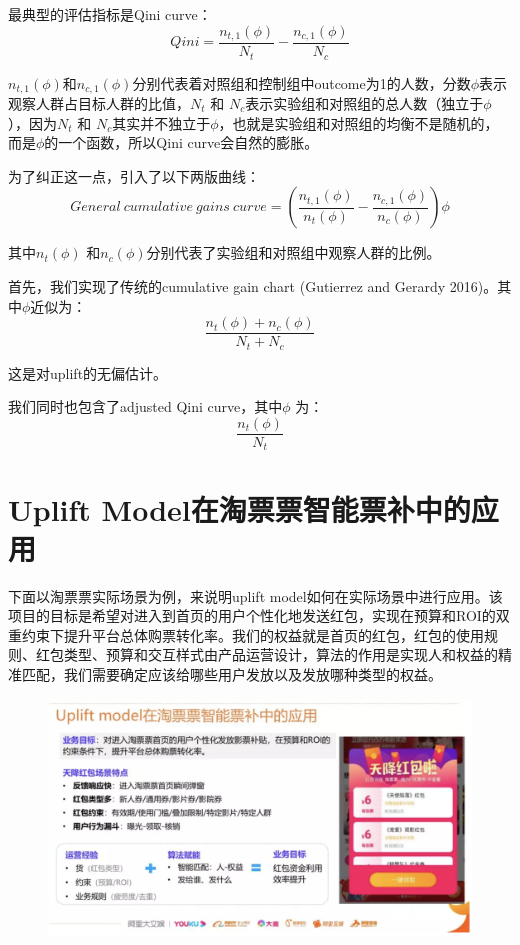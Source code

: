 \documentclass[12pt]{article}
\begin{document}
最典型的评估指标是Qini curve：
$$
Qini = \frac{n_{t,1}(\phi)}{N_t} - \frac{n_{c,1}(\phi)}{N_c}
$$

$n_{t,1}(\phi)$和$n_{c,1}(\phi)$分别代表着对照组和控制组中outcome为1的人数，分数$\phi$表示观察人群占目标人群的比值，$N_t$ 和 $N_c$表示实验组和对照组的总人数（独立于$\phi$），因为$N_t$ 和 $N_c$其实并不独立于$\phi$，也就是实验组和对照组的均衡不是随机的，而是$\phi$的一个函数，所以Qini curve会自然的膨胀。

为了纠正这一点，引入了以下两版曲线：
$$
General \ cumulative \ gains \ curve =  (\frac{n_{t,1}(\phi)}{n_t(\phi)} - \frac{n_{c,1}(\phi)}{n_c(\phi)})\phi
$$

其中$n_t(\phi)$ 和$n_c(\phi)$分别代表了实验组和对照组中观察人群的比例。

首先，我们实现了传统的cumulative gain chart (Gutierrez and Gerardy 2016)。其中$\phi$近似为：
$$
\frac{n_t(\phi) + n_c(\phi)}{N_t + N_c}
$$

这是对uplift的无偏估计。

我们同时也包含了adjusted Qini curve，其中$\phi$ 为：
$$
\frac{n_t(\phi)}{N_t}
$$


\section{Uplift Model在淘票票智能票补中的应用}
下面以淘票票实际场景为例，来说明uplift model如何在实际场景中进行应用。该项目的目标是希望对进入到首页的用户个性化地发送红包，实现在预算和ROI的双重约束下提升平台总体购票转化率。我们的权益就是首页的红包，红包的使用规则、红包类型、预算和交互样式由产品运营设计，算法的作用是实现人和权益的精准匹配，我们需要确定应该给哪些用户发放以及发放哪种类型的权益。
\begin{figure}[H]
    \centering
    \includegraphics[width=1\textwidth]{fig/CasualInference-Uplift-Model-In-Ali.png}
\end{figure}
\end{document}
